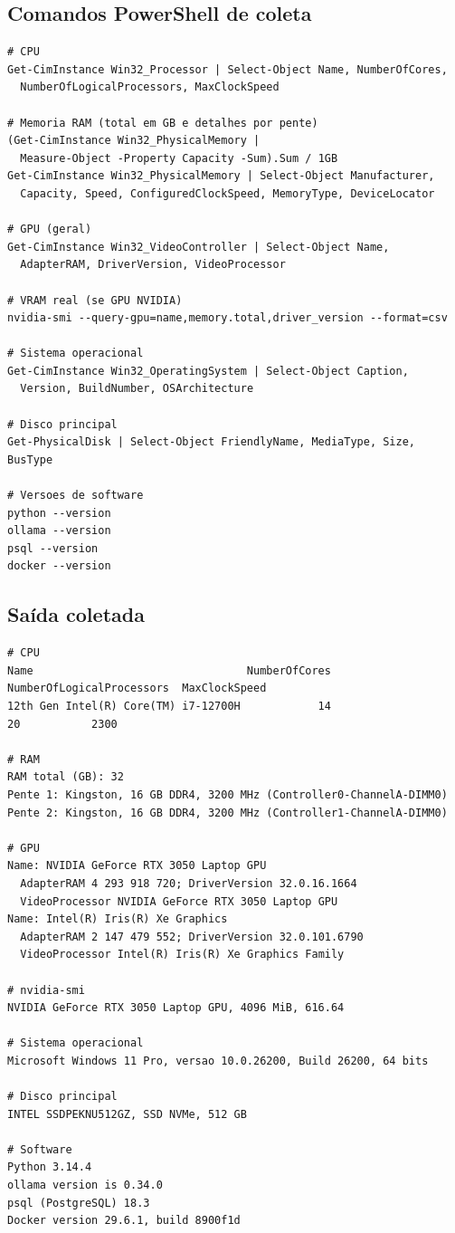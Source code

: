 \subsection{Comandos PowerShell de coleta}
\label{apx:specs-comandos}

{\footnotesize
\begin{verbatim}
# CPU
Get-CimInstance Win32_Processor | Select-Object Name, NumberOfCores,
  NumberOfLogicalProcessors, MaxClockSpeed

# Memoria RAM (total em GB e detalhes por pente)
(Get-CimInstance Win32_PhysicalMemory |
  Measure-Object -Property Capacity -Sum).Sum / 1GB
Get-CimInstance Win32_PhysicalMemory | Select-Object Manufacturer,
  Capacity, Speed, ConfiguredClockSpeed, MemoryType, DeviceLocator

# GPU (geral)
Get-CimInstance Win32_VideoController | Select-Object Name,
  AdapterRAM, DriverVersion, VideoProcessor

# VRAM real (se GPU NVIDIA)
nvidia-smi --query-gpu=name,memory.total,driver_version --format=csv

# Sistema operacional
Get-CimInstance Win32_OperatingSystem | Select-Object Caption,
  Version, BuildNumber, OSArchitecture

# Disco principal
Get-PhysicalDisk | Select-Object FriendlyName, MediaType, Size, BusType

# Versoes de software
python --version
ollama --version
psql --version
docker --version
\end{verbatim}
}

\subsection{Saída coletada}
\label{apx:specs-resultado}

{\scriptsize
\begin{verbatim}
# CPU
Name                                 NumberOfCores  NumberOfLogicalProcessors  MaxClockSpeed
12th Gen Intel(R) Core(TM) i7-12700H            14                         20           2300

# RAM
RAM total (GB): 32
Pente 1: Kingston, 16 GB DDR4, 3200 MHz (Controller0-ChannelA-DIMM0)
Pente 2: Kingston, 16 GB DDR4, 3200 MHz (Controller1-ChannelA-DIMM0)

# GPU
Name: NVIDIA GeForce RTX 3050 Laptop GPU
  AdapterRAM 4 293 918 720; DriverVersion 32.0.16.1664
  VideoProcessor NVIDIA GeForce RTX 3050 Laptop GPU
Name: Intel(R) Iris(R) Xe Graphics
  AdapterRAM 2 147 479 552; DriverVersion 32.0.101.6790
  VideoProcessor Intel(R) Iris(R) Xe Graphics Family

# nvidia-smi
NVIDIA GeForce RTX 3050 Laptop GPU, 4096 MiB, 616.64

# Sistema operacional
Microsoft Windows 11 Pro, versao 10.0.26200, Build 26200, 64 bits

# Disco principal
INTEL SSDPEKNU512GZ, SSD NVMe, 512 GB

# Software
Python 3.14.4
ollama version is 0.34.0
psql (PostgreSQL) 18.3
Docker version 29.6.1, build 8900f1d
\end{verbatim}
}

